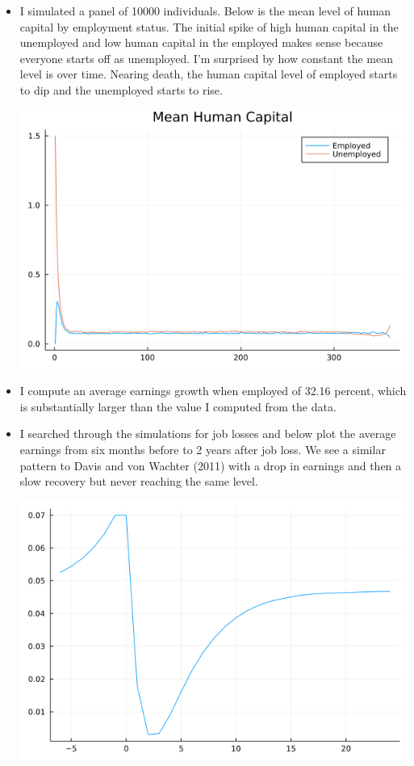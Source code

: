 \documentclass{article}
\begin{document}
\begin{itemize}
\pagebreak

\item I simulated a panel of 10000 individuals.  Below is the mean level of human capital by employment status.  The initial spike of high human capital in the unemployed and low human capital in the employed makes sense because everyone starts off as unemployed.  I'm surprised by how constant the mean level is over time.  Nearing death, the human capital level of employed starts to dip and the unemployed starts to rise.

\includegraphics[scale=0.5]{mean_human_capital}

\item I compute an average earnings growth when employed of 32.16 percent, which is substantially larger than the value I computed from the data.

\item I searched through the simulations for job losses and below plot the average earnings from six months before to 2 years after job loss. We see a similar pattern to Davis and von Wachter (2011) with a drop in earnings and then a slow recovery but never reaching the same level.

\includegraphics[scale=0.5]{jl}


\end{itemize}
\end{document}
